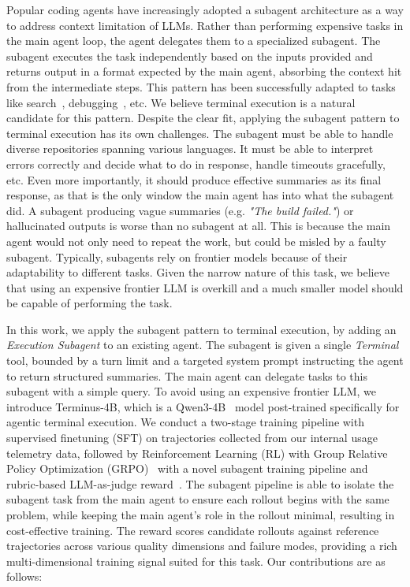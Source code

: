 \documentclass[sigconf,review]{acmart}
\begin{document}
Popular coding agents have increasingly adopted a subagent architecture as a way to address context limitation of LLMs. Rather than performing expensive tasks in the main agent loop, the agent delegates them to a specialized subagent. The subagent executes the task independently based on the inputs provided and returns output in a format expected by the main agent, absorbing the context hit from the intermediate steps. This pattern has been successfully adapted to tasks like search~\cite{claude_code_2024}, debugging~\cite{debug2fix}, etc. We believe terminal execution is a natural candidate for this pattern.%
Despite the clear fit, applying the subagent pattern to terminal execution has its own challenges. The subagent must be able to handle diverse repositories spanning various languages. It must be able to interpret errors correctly and decide what to do in response, handle timeouts gracefully, etc. Even more importantly, it should produce effective summaries as its final response, as that is the only window the main agent has into what the subagent did. A subagent producing vague summaries (e.g. \textit{"The build failed."}) or hallucinated outputs is worse than no subagent at all. This is because the main agent would not only need to repeat the work, but could be misled by a faulty subagent. Typically, subagents rely on frontier models because of their adaptability to different tasks. Given the narrow nature of this task, we believe that using an expensive frontier LLM is overkill and a much smaller model should be capable of performing the task. 

In this work, we apply the subagent pattern to terminal execution, by adding an \textit{Execution Subagent} to an existing agent. The subagent is given a single \textit{Terminal} tool, bounded by a turn limit and a targeted system prompt instructing the agent to return structured summaries. The main agent can delegate tasks to this subagent with a simple query. To avoid using an expensive frontier LLM, we introduce Terminus-4B, which is a Qwen3-4B~\cite{qwen} model post-trained specifically for agentic terminal execution. We conduct a two-stage training pipeline with supervised finetuning (SFT) on trajectories collected from our internal usage telemetry data, followed by Reinforcement Learning (RL) with Group Relative Policy Optimization (GRPO)~\cite{grpo} with a novel subagent training pipeline and rubric-based LLM-as-judge reward~\cite{llmjudge, rubric}. The subagent pipeline is able to isolate the subagent task from the main agent to ensure each rollout begins with the same problem, while keeping the main agent's role in the rollout minimal, resulting in cost-effective training. The reward scores candidate rollouts against reference trajectories across various quality dimensions and failure modes, providing a rich multi-dimensional training signal suited for this task. Our contributions are as follows:
\end{document}
